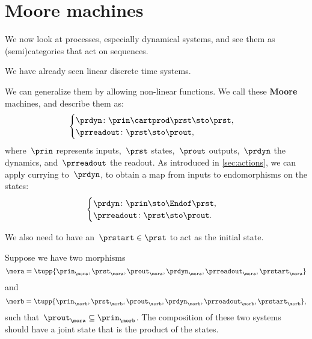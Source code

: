 
\section{Moore machines}
\label{sec:moore-machines}

We now look at processes, especially dynamical systems, and see them as (semi)\-categories that act on sequences.

We have already seen linear discrete time systems.

We can generalize them by allowing non-linear functions.
We call these \textbf{Moore} machines, and describe them as:
%
\begin{equation}
	\label{eq:moore-1}
	\begin{cases}
		\prdyn \colon \prin \cartprod \prst \sto \prst, \\
		\prreadout \colon \prst \sto \prout,
	\end{cases}
\end{equation}
%
where~$\prin$ represents inputs,~$\prst$ states,~$\prout$ outputs,~$\prdyn$ the dynamics, and~$\prreadout$ the readout.
As introduced in \cref{sec:actions}, we can apply currying to~$\prdyn$, to obtain a map from inputs to endomorphisms on the states:
%
\begin{equation}
	\label{eq:moore-1-endo}
	\begin{cases}
		\prdyn \colon \prin \sto \Endof \prst, \\
		\prreadout \colon \prst \sto \prout.
	\end{cases}
\end{equation}
%

We also need to have an~$\prstart \in \prst$ to act as the initial state.

Suppose we have two morphisms
%
\begin{equation}
	\label{eq:moore-mora}
	\mora = \tupp{\prin_{\mora},\prst_{\mora},\prout_{\mora},\prdyn_{\mora},\prreadout_{\mora},\prstart_{\mora}}
\end{equation}
%
and
%
\begin{equation}
	\label{eq:moore-morb}
	\morb = \tupp{\prin_{\morb},\prst_{\morb},\prout_{\morb},\prdyn_{\morb},\prreadout_{\morb},\prstart_{\morb}},
\end{equation}
such that~$\prout_{\mora} \subseteq \prin_{\morb}$.
The composition of these two systems should have a joint state that is the product of the states.

